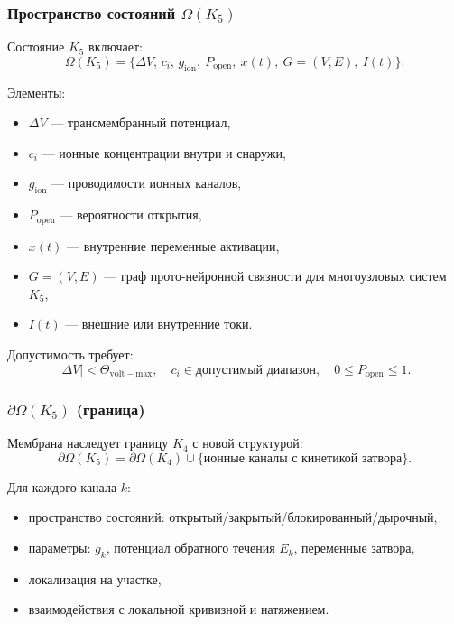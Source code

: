 \subsubsection{Пространство состояний \texorpdfstring{$\Omega(K_5)$}{\Omega(K_5)}}

Состояние $K_5$ включает:
\[
\Omega(K_5) = \{ \Delta V,\, c_i,\, g_{\mathrm{ion}},\
                P_{\mathrm{open}},\
                x(t),\
                G=(V,E),\
                I(t) \}.
\]

Элементы:
\begin{itemize}
    \item $\Delta V$ — трансмембранный потенциал,
    \item $c_i$ — ионные концентрации внутри и снаружи,
    \item $g_{\mathrm{ion}}$ — проводимости ионных каналов,
    \item $P_{\mathrm{open}}$ — вероятности открытия,
    \item $x(t)$ — внутренние переменные активации,
    \item $G=(V,E)$ — граф прото-нейронной связности для многоузловых систем
          $K_5$,
    \item $I(t)$ — внешние или внутренние токи.
\end{itemize}

Допустимость требует:
\[
|\Delta V| < \Theta_{\mathrm{volt-max}}, \quad
  c_i \in \text{допустимый диапазон}, \quad
0 \le P_{\mathrm{open}} \le 1.
\]

\subsubsection{\texorpdfstring{$\partial\Omega(K_5)$}{\partial\Omega(K_5)} (граница)}

Мембрана наследует границу $K_4$ с новой структурой:
\[
\partial\Omega(K_5)
    = \partial\Omega(K_4)
       \cup \{ \text{ионные каналы с кинетикой затвора} \}.
\]

Для каждого канала $k$:
\begin{itemize}
    \item пространство состояний: открытый/закрытый/блокированный/дырочный,
    \item параметры: $g_k$, потенциал обратного течения $E_k$, переменные
          затвора,
    \item локализация на участке,
    \item взаимодействия с локальной кривизной и натяжением.
\end{itemize}

